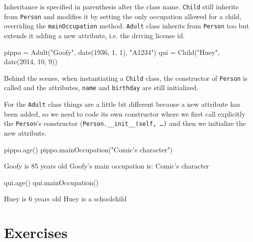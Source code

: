 Inheritance is specified in parenthesis after the class name. \texttt{Child} still inherits from \texttt{Person} and modifies it by setting the only occupation allowed for a child, overriding the \texttt{mainOccupation} method. \texttt{Adult} class inherits from \texttt{Person} too but extends it adding a new attribute, i.e. the driving license id. 

\begin{ipython}
pippo = Adult("Goofy", date(1936, 1, 1), "A1234")
qui = Child("Huey", date(2014, 10, 9))
\end{ipython}

Behind the scenes, when instantiating a \texttt{Child} class, the constructor of \texttt{Person} is called and the attributes, \texttt{name} and \texttt{birthday} are still initialized.  

For the \texttt{Adult} class things are a little bit different because a new attribute has been added, so we need to code its own constructor where we first call explicitly the \texttt{Person}'s constructor (\texttt{Person.\_\_init\_\_(self, \ldots)} and then we initialize the new attribute.

\begin{ipython}
pippo.age()
pippo.mainOccupation("Comic's character")
\end{ipython}
\begin{ioutput}
Goofy is 85 years old
Goofy's main occupation is: Comic's character
\end{ioutput}

\begin{ipython}
qui.age()
qui.mainOccupation()
\end{ipython}
\begin{ioutput}
Huey is 6 years old
Huey is a schoolchild
\end{ioutput}

\section*{Exercises}

